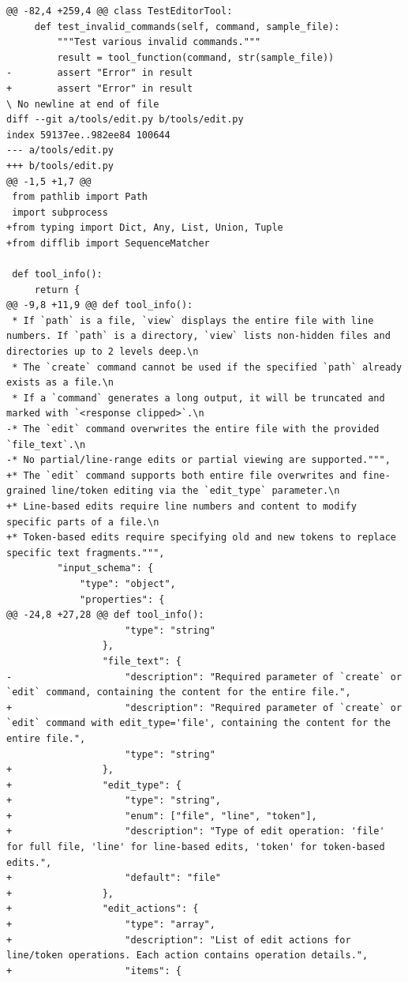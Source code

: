 \documentclass{article} %
\begin{document}
\begin{lstlisting}[style=diffstyle]
@@ -82,4 +259,4 @@ class TestEditorTool:
     def test_invalid_commands(self, command, sample_file):
         """Test various invalid commands."""
         result = tool_function(command, str(sample_file))
-        assert "Error" in result
+        assert "Error" in result
\ No newline at end of file
diff --git a/tools/edit.py b/tools/edit.py
index 59137ee..982ee84 100644
--- a/tools/edit.py
+++ b/tools/edit.py
@@ -1,5 +1,7 @@
 from pathlib import Path
 import subprocess
+from typing import Dict, Any, List, Union, Tuple
+from difflib import SequenceMatcher
 
 def tool_info():
     return {
@@ -9,8 +11,9 @@ def tool_info():
 * If `path` is a file, `view` displays the entire file with line numbers. If `path` is a directory, `view` lists non-hidden files and directories up to 2 levels deep.\n
 * The `create` command cannot be used if the specified `path` already exists as a file.\n
 * If a `command` generates a long output, it will be truncated and marked with `<response clipped>`.\n
-* The `edit` command overwrites the entire file with the provided `file_text`.\n
-* No partial/line-range edits or partial viewing are supported.""",
+* The `edit` command supports both entire file overwrites and fine-grained line/token editing via the `edit_type` parameter.\n
+* Line-based edits require line numbers and content to modify specific parts of a file.\n
+* Token-based edits require specifying old and new tokens to replace specific text fragments.""",
         "input_schema": {
             "type": "object",
             "properties": {
@@ -24,8 +27,28 @@ def tool_info():
                     "type": "string"
                 },
                 "file_text": {
-                    "description": "Required parameter of `create` or `edit` command, containing the content for the entire file.",
+                    "description": "Required parameter of `create` or `edit` command with edit_type='file', containing the content for the entire file.",
                     "type": "string"
+                },
+                "edit_type": {
+                    "type": "string",
+                    "enum": ["file", "line", "token"],
+                    "description": "Type of edit operation: 'file' for full file, 'line' for line-based edits, 'token' for token-based edits.",
+                    "default": "file"
+                },
+                "edit_actions": {
+                    "type": "array",
+                    "description": "List of edit actions for line/token operations. Each action contains operation details.",
+                    "items": {

\end{lstlisting}
\end{document}
